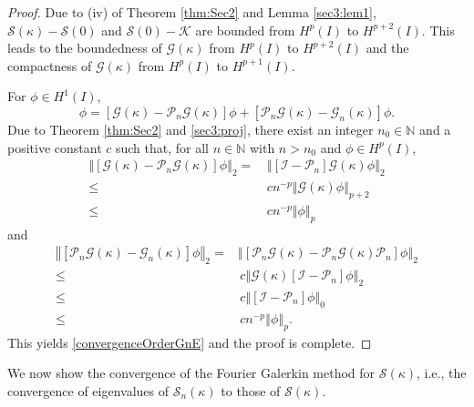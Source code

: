 \documentclass{article}
\newcommand{\norm}[1]{\left\Vert#1\right\Vert}
\begin{document}
	\begin{proof}
		 Due to (iv) of Theorem \ref{thm:Sec2} and Lemma \ref{sec3:lem1}, $\mathcal{S}(\kappa)-\mathcal{S}(0)$ and
		 $\mathcal{S}(0)-\mathcal{K}$ are bounded from $H^{p}(I)$ to $H^{p+2}(I)$.
		  This leads to the boundedness of $\mathcal{G}(\kappa)$  from $H^{p}(I)$ to $H^{p+2}(I)$ and 
		 the compactness of $\mathcal{G}(\kappa)$  from $H^{p}(I)$ to $H^{p+1}(I)$. 
		
		For $\phi\in H^{1}(I)$,
		\begin{equation*}
			[\mathcal{G}(\kappa)-\mathcal{G}_n(\kappa)]\phi=[\mathcal{G}(\kappa)-\mathcal{P}_n\mathcal{G}(\kappa)]\phi+[\mathcal{P}_n\mathcal{G}(\kappa)-\mathcal{G}_n(\kappa)]\phi.
		\end{equation*}
	    Due to Theorem \ref{thm:Sec2} and \eqref{sec3:proj}, 
	    there exist an integer $n_0\in\mathbb{N}$ and a positive constant $c$ such that, for all $n\in\mathbb{N}$ with $n>n_0$ and $\phi\in H^{p}(I)$,
	    \begin{align*}
	    	\norm{[\mathcal{G}(\kappa)-\mathcal{P}_n\mathcal{G}(\kappa)]\phi}_{2}
	    	=& \, \norm{[\mathcal{I}-\mathcal{P}_n]\mathcal{G}(\kappa)\phi}_{2} \\
	    	\leq &\, c n^{-p}\norm{\mathcal{G}(\kappa)\phi}_{p+2}\\
	    	\leq&\, c n^{-p}\norm{\phi}_{p}
	    \end{align*} 
	    and 
	    \begin{align*}
	    	\norm{[\mathcal{P}_n\mathcal{G}(\kappa)-\mathcal{G}_n(\kappa)]\phi}_{2} = &\norm{[\mathcal{P}_n\mathcal{G}(\kappa)-\mathcal{P}_n\mathcal{G}(\kappa)\mathcal{P}_n]\phi}_{2} \\
	    	\leq &\, c\norm{\mathcal{G}(\kappa)[\mathcal{I}-\mathcal{P}_n]\phi}_{2}\\
	    	\leq&\, c \norm{[\mathcal{I}-\mathcal{P}_n]\phi}_{0} \\
	    	\leq &\,c n^{-p}\norm{\phi}_{p}.
	    \end{align*} 
	    This yields \eqref{convergenceOrderGnE} and the proof is complete.
		
		
		
		
		
	\end{proof}
	
	 We now show the convergence of the Fourier Galerkin method for $\mathcal{S}(\kappa)$, i.e., the convergence of eigenvalues of $\mathcal{S}_n(\kappa)$ to those of $\mathcal{S}(\kappa)$.
	
\end{document}
